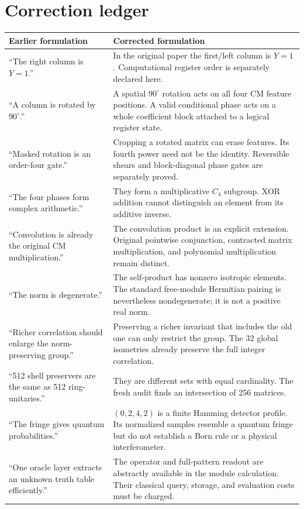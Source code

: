 \documentclass[11pt,a4paper]{article}
\theoremstyle{definition}\newtheorem{definition}[theorem]{Definition}
\theoremstyle{remark}\newtheorem{remark}[theorem]{Remark}
\numberwithin{equation}{section}
\begin{document}
\section{Correction ledger}\label{app:corrections}
\begin{longtable}{@{}L{0.31\textwidth}L{0.63\textwidth}@{}}
\toprule Earlier formulation & Corrected formulation\\\midrule\endhead
``The right column is $Y=1$.'' & In the original paper the first/left column is $Y=1$. Computational register order is separately declared here.\\
``A column is rotated by $90^\circ$.'' & A spatial $90^\circ$ rotation acts on all four CM feature positions. A valid conditional phase acts on a whole coefficient block attached to a logical register state.\\
``Masked rotation is an order-four gate.'' & Cropping a rotated matrix can erase features. Its fourth power need not be the identity. Reversible shears and block-diagonal phase gates are separately proved.\\
``The four phases form complex arithmetic.'' & They form a multiplicative $C_4$ subgroup. XOR addition cannot distinguish an element from its additive inverse.\\
``Convolution is already the original CM multiplication.'' & The convolution product is an explicit extension. Original pointwise conjunction, contracted matrix multiplication, and polynomial multiplication remain distinct.\\
``The norm is degenerate.'' & The self-product has nonzero isotropic elements. The standard free-module Hermitian pairing is nevertheless nondegenerate; it is not a positive real norm.\\
``Richer correlation should enlarge the norm-preserving group.'' & Preserving a richer invariant that includes the old one can only restrict the group. The 32 global isometries already preserve the full integer correlation.\\
``512 shell preservers are the same as 512 ring-unitaries.'' & They are different sets with equal cardinality. The fresh audit finds an intersection of 256 matrices.\\
``The fringe gives quantum probabilities.'' & $(0,2,4,2)$ is a finite Hamming detector profile. Its normalized samples resemble a quantum fringe but do not establish a Born rule or a physical interferometer.\\
``One oracle layer extracts an unknown truth table efficiently.'' & The operator and full-pattern readout are abstractly available in the module calculation. Their classical query, storage, and evaluation costs must be charged.\\

\end{longtable}
\end{document}
